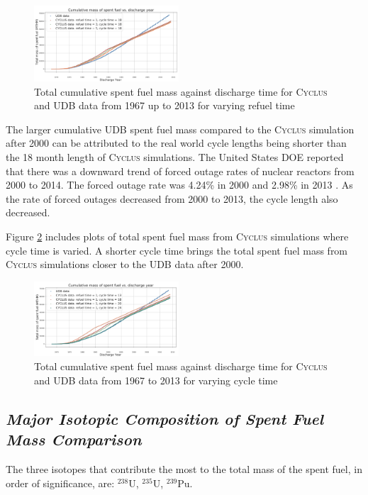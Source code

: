 \documentclass{anstrans}
\newcommand{\Cyclus}{\textsc{Cyclus}\xspace}%
\begin{document}
\begin{figure}[h] 
	\centering
	\includegraphics[width=0.48\textwidth]{total_cumulative_mass_spent_fuel_refueltime}
	\caption{Total cumulative spent fuel mass against discharge time for \Cyclus and UDB data from 1967 up to 2013 for varying refuel time}
	\label{fig:total_refueltime}
\end{figure} 

The larger cumulative UDB spent fuel mass compared to the \Cyclus simulation after 2000 can be attributed to the real world cycle lengths being shorter than the 18 month length of \Cyclus simulations. The United States DOE reported that there was a downward trend of forced outage rates of nuclear reactors from 2000 to 2014. The forced outage rate was 4.24\% in 2000 and 2.98\% in 2013 \cite{gehin_nuclear_2016}. As the rate of forced outages decreased from 2000 to 2013, the cycle length also decreased. 

Figure \ref{fig:total_cycletime} includes plots of total spent fuel mass from \Cyclus simulations where cycle time is varied. A shorter cycle time brings the total spent fuel mass from \Cyclus simulations closer to the UDB data after 2000. 

\begin{figure}[h] %
	\centering
	\includegraphics[width=0.48\textwidth]{total_cumulative_mass_spent_fuel_cycletime}
	\caption{Total cumulative spent fuel mass against discharge time for \Cyclus and UDB data from 1967 to 2013 for varying cycle time}
	\label{fig:total_cycletime}
\end{figure} 

\subsection{\textit{Major Isotopic Composition of  Spent Fuel Mass Comparison}}
The three isotopes that contribute the most to the total mass of the spent fuel, in order of significance, are: $^{238}$U, $^{235}$U, $^{239}$Pu.  
\end{document}
